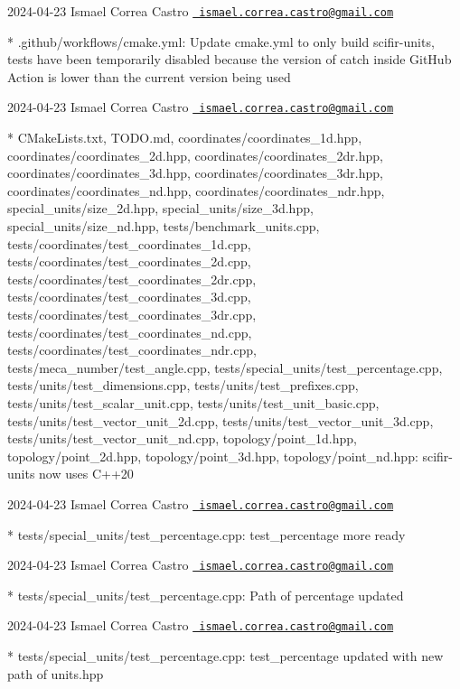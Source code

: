  2024-\/04-\/23 Ismael Correa Castro \href{mailto:ismael.correa.castro@gmail.com}{\texttt{ ismael.\+correa.\+castro@gmail.\+com}} \begin{DoxyVerb}* .github/workflows/cmake.yml: Update cmake.yml to only build
scifir-units, tests have been temporarily disabled because the
version of catch inside GitHub Action is lower than the current
version being used
\end{DoxyVerb}
 2024-\/04-\/23 Ismael Correa Castro \href{mailto:ismael.correa.castro@gmail.com}{\texttt{ ismael.\+correa.\+castro@gmail.\+com}} \begin{DoxyVerb}* CMakeLists.txt, TODO.md, coordinates/coordinates_1d.hpp,
coordinates/coordinates_2d.hpp, coordinates/coordinates_2dr.hpp,
coordinates/coordinates_3d.hpp, coordinates/coordinates_3dr.hpp,
coordinates/coordinates_nd.hpp, coordinates/coordinates_ndr.hpp,
special_units/size_2d.hpp, special_units/size_3d.hpp,
special_units/size_nd.hpp, tests/benchmark_units.cpp,
tests/coordinates/test_coordinates_1d.cpp,
tests/coordinates/test_coordinates_2d.cpp,
tests/coordinates/test_coordinates_2dr.cpp,
tests/coordinates/test_coordinates_3d.cpp,
tests/coordinates/test_coordinates_3dr.cpp,
tests/coordinates/test_coordinates_nd.cpp,
tests/coordinates/test_coordinates_ndr.cpp,
tests/meca_number/test_angle.cpp,
tests/special_units/test_percentage.cpp,
tests/units/test_dimensions.cpp, tests/units/test_prefixes.cpp,
tests/units/test_scalar_unit.cpp, tests/units/test_unit_basic.cpp,
tests/units/test_vector_unit_2d.cpp,
tests/units/test_vector_unit_3d.cpp,
tests/units/test_vector_unit_nd.cpp, topology/point_1d.hpp,
topology/point_2d.hpp, topology/point_3d.hpp, topology/point_nd.hpp: 
scifir-units now uses C++20
\end{DoxyVerb}
 2024-\/04-\/23 Ismael Correa Castro \href{mailto:ismael.correa.castro@gmail.com}{\texttt{ ismael.\+correa.\+castro@gmail.\+com}} \begin{DoxyVerb}* tests/special_units/test_percentage.cpp: test_percentage more
ready
\end{DoxyVerb}
 2024-\/04-\/23 Ismael Correa Castro \href{mailto:ismael.correa.castro@gmail.com}{\texttt{ ismael.\+correa.\+castro@gmail.\+com}} \begin{DoxyVerb}* tests/special_units/test_percentage.cpp: Path of percentage
updated
\end{DoxyVerb}
 2024-\/04-\/23 Ismael Correa Castro \href{mailto:ismael.correa.castro@gmail.com}{\texttt{ ismael.\+correa.\+castro@gmail.\+com}} \begin{DoxyVerb}* tests/special_units/test_percentage.cpp: test_percentage updated
with new path of units.hpp
\end{DoxyVerb}
